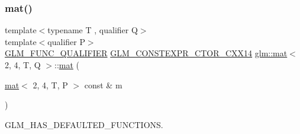 \mbox{\label{structglm_1_1mat_3_012_00_014_00_01_t_00_01_q_01_4_a20ea2b3c9367a0ab927a96a1b37cf119}} 
\subsubsection{\texorpdfstring{mat()}{mat()}\hspace{0.1cm}{\footnotesize\ttfamily [18/21]}}
{\footnotesize\ttfamily template$<$typename T , qualifier Q$>$ \\
template$<$qualifier P$>$ \\
\mbox{\hyperlink{setup_8hpp_a33fdea6f91c5f834105f7415e2a64407}{G\+L\+M\+\_\+\+F\+U\+N\+C\+\_\+\+Q\+U\+A\+L\+I\+F\+I\+ER}} \mbox{\hyperlink{setup_8hpp_a0900f9145e68bf6061b6f5e7be3fa751}{G\+L\+M\+\_\+\+C\+O\+N\+S\+T\+E\+X\+P\+R\+\_\+\+C\+T\+O\+R\+\_\+\+C\+X\+X14}} \mbox{\hyperlink{structglm_1_1mat}{glm\+::mat}}$<$ 2, 4, T, Q $>$\+::\mbox{\hyperlink{structglm_1_1mat}{mat}} (\begin{DoxyParamCaption}\item[{\mbox{\hyperlink{structglm_1_1mat}{mat}}$<$ 2, 4, T, P $>$ const \&}]{m }\end{DoxyParamCaption})}



G\+L\+M\+\_\+\+H\+A\+S\+\_\+\+D\+E\+F\+A\+U\+L\+T\+E\+D\+\_\+\+F\+U\+N\+C\+T\+I\+O\+NS. 

\mbox{\label{structglm_1_1mat_3_012_00_014_00_01_t_00_01_q_01_4_a6d81f6d524f14f933d44911cc8049b01}} 
